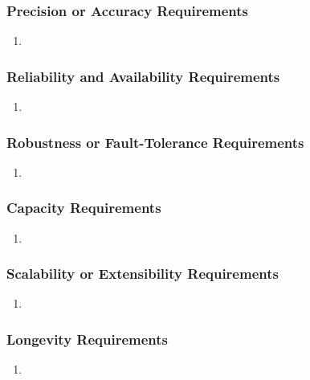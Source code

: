 \documentclass[]{article}
\begin{document}
\subsubsection{Precision or Accuracy Requirements}
\label{ssub:precision_or_accuracy_requirements}
\begin{enumerate}[{PR}1. ]
	\item 
\end{enumerate}

\subsubsection{Reliability and Availability Requirements}
\label{ssub:reliability_and_availability_requirements}
\begin{enumerate}[{PR}1. ]
	\item 
\end{enumerate}

\subsubsection{Robustness or Fault-Tolerance Requirements}
\label{ssub:robustness_or_fault_tolerance_requirements}
\begin{enumerate}[{PR}1. ]
	\item 
\end{enumerate}

\subsubsection{Capacity Requirements}
\label{ssub:capacity_requirements}
\begin{enumerate}[{PR}1. ]
	\item 
\end{enumerate}

\subsubsection{Scalability or Extensibility Requirements}
\label{ssub:scalability_or_extensibility_requirements}
\begin{enumerate}[{PR}1. ]
	\item 
\end{enumerate}

\subsubsection{Longevity Requirements}
\label{ssub:longevity_requirements}
\begin{enumerate}[{PR}1. ]
	\item 
\end{enumerate}
\end{document}
